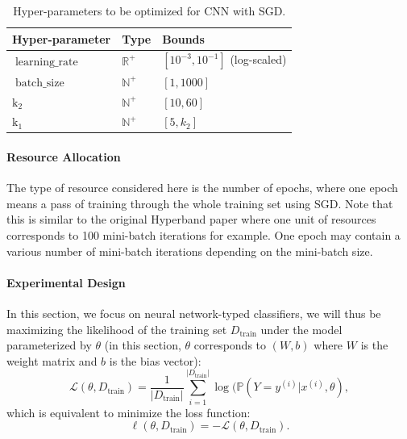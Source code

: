 \documentclass[runningheads,a4paper]{llncs}
\begin{document}
\begin{table}[ht]
\centering
\begin{tabular}{@{}lll@{}}
\toprule
\textbf{Hyper-parameter} & \textbf{Type}                      & \textbf{Bounds}               \\ \midrule
$\operatorname{learning\_rate}$                & $\mathbb{R}^+$ & $\left[ 10^{-3}, 10^{-1} \right]$ (log-scaled) \\
$\operatorname{batch\_size}$           & $\mathbb{N}^+$ & $\left[1, 1000 \right]$         \\
$\operatorname{k_2}$           & $\mathbb{N}^+$ & $\left[10,  60 \right]$         \\
$\operatorname{k_1}$           & $\mathbb{N}^+$ & $\left[5,  k_2 \right]$         \\ \bottomrule
\end{tabular}
\caption{Hyper-parameters to be optimized for CNN with SGD.}
\label{cnn_sgd}
\end{table}

\paragraph{\textbf{Resource Allocation}} The type of resource considered here is the number of epochs, where one epoch means a pass of training through the whole training set using SGD. Note that this is similar to the original Hyperband paper where one unit of resources corresponds to 100 mini-batch iterations for example. One epoch may contain a various number of mini-batch iterations depending on the mini-batch size.

\paragraph{\textbf{Experimental Design}} In this section, we focus on neural network-typed classifiers, we will thus be maximizing the likelihood of the training set $D_{\operatorname{train}}$ under the model parameterized by $\theta$ (in this section, $\theta$ corresponds to $(W, b)$ where $W$ is the weight matrix and $b$ is the bias vector):
\[
\mathcal{L}(\theta, D_{\operatorname{train}}) = \frac{1}{|D_{\operatorname{train}}|} \sum_{i=1}^{|D_{\operatorname{train}}|} \log (\mathbb{P}(Y=y^{(i)}|x^{(i)},\theta),
\]
which is equivalent to minimize the loss function:
\[
\ell(\theta, D_{\operatorname{train}}) = -\mathcal{L}(\theta, D_{\operatorname{train}}).
\]
\end{document}
